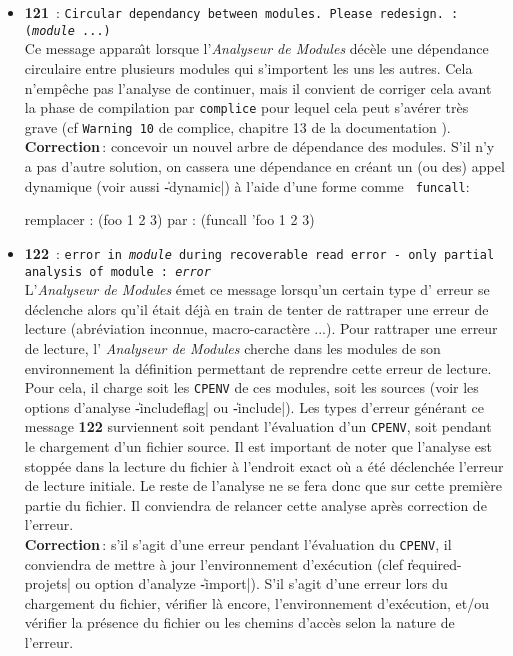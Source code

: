 \begin{itemize}
\item {\Large {\bf 121}}\ : {\tt Circular dependancy between modules. Please
redesign. : ({\em module} ...)}\\
Ce message appara\^{\i}t lorsque l'{\em Analyseur de Modules} d\'{e}c\`{e}le une
d\'{e}pendance circulaire entre plusieurs modules qui s'importent les uns
les autres. Cela n'emp\^{e}che pas
l'analyse de continuer, mais il convient de corriger cela avant la
phase de compilation par {\tt complice} pour lequel cela peut
s'av\'{e}rer tr\`{e}s grave (cf {\tt Warning 10} de complice, chapitre 13
de la documentation \LeLisp).\\
{\bf Correction}\,: concevoir un nouvel arbre de d\'{e}pendance des
modules. S'il n'y a pas d'autre solution, on cassera
une d\'{e}pendance en cr\'{e}ant un (ou des) appel
dynamique (voir aussi \|-dynamic|) \`{a} l'aide d'une forme comme {\tt
funcall}: 
\begin{Code*}
remplacer :  (foo 1 2 3)
par : (funcall 'foo 1 2 3)
\end{Code*}

\item {\Large {\bf 122}}\ : {\tt error in {\em module} during recoverable read
error - only partial analysis of module : {\em error}}\\
L'{\em Analyseur de Modules} \'{e}met ce message lorsqu'un certain type d'
erreur se d\'{e}clenche alors qu'il \'{e}tait d\'{e}j\`{a} en train de tenter de
rattraper une erreur de lecture (abr\'{e}viation inconnue,
macro-caract\`{e}re ...). Pour rattraper une erreur de lecture, l'{\em
Analyseur de Modules}  cherche dans les modules de son environnement
la d\'{e}finition permettant de reprendre cette erreur de lecture. Pour
cela, il charge soit les {\tt CPENV} de ces modules, soit les sources
(voir les options d'analyse \|-includeflag| ou \|-include|).
Les types d'erreur g\'{e}n\'{e}rant ce message {\bf 122} surviennent soit
pendant l'\'{e}valuation d'un {\tt CPENV}, soit pendant le chargement
d'un fichier source. Il est important de noter que l'analyse est
stopp\'{e}e dans la lecture du fichier \`{a} l'endroit exact o\`{u} a \'{e}t\'{e}
d\'{e}clench\'{e}e l'erreur de lecture initiale. Le reste de l'analyse ne se
fera donc que sur cette premi\`{e}re partie du fichier. Il conviendra de
relancer cette analyse apr\`{e}s correction de l'erreur. \\
{\bf Correction}\,: s'il
s'agit d'une erreur pendant l'\'{e}valuation du {\tt CPENV}, il
conviendra de mettre \`{a} jour l'environnement d'ex\'{e}cution (clef
\|required-projets| ou option d'analyze \|-import|). S'il s'agit d'une
erreur lors du chargement du fichier, v\'{e}rifier l\`{a} encore,
l'environnement d'ex\'{e}cution, et/ou v\'{e}rifier la pr\'{e}sence du fichier
ou les chemins d'acc\`{e}s selon la nature de l'erreur.


\end{itemize}
